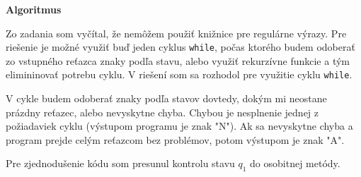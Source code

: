 \documentclass[12pt,a4paper]{article}
\newcommand{\noindentfix}{\vspace{10pt}\noindent}
\newcommand{\subchapterheader}[1]{{\noindent\fontsize{16}{14}\textbf{#1}\vspace{2pt}}}
\begin{document}
    \pagebreak
    \subchapterheader{Algoritmus}

    \noindentfix Zo zadania som vyčítal, že nemôžem použiť knižnice pre regulárne výrazy. Pre riešenie je možné využiť buď jeden cyklus \texttt{while}, počas ktorého budem odoberať zo vstupného reťazca znaky podľa stavu, alebo využiť rekurzívne funkcie a tým elimininovať potrebu cyklu. V riešení som sa rozhodol pre využitie cyklu \texttt{while}.

    \noindentfix V cykle budem odoberať znaky podľa stavov dovtedy, dokým mi neostane prázdny reťazec, alebo nevyskytne chyba. Chybou je nesplnenie jednej z požiadaviek cyklu (výstupom programu je znak "N"). Ak sa nevyskytne chyba a program prejde celým reťazcom bez problémov, potom výstupom je znak "A".

    \noindentfix Pre zjednodušenie kódu som presunul kontrolu stavu $q_1$ do osobitnej metódy.

\end{document}
